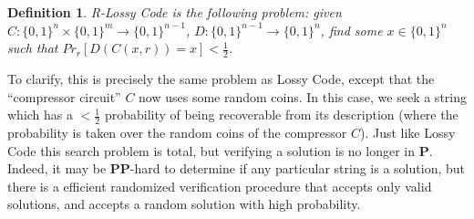 \documentclass[11pt]{article}
\newtheorem{definition}{Definition}
\newcommand{\B}{\{0,1\}}
\def\cl{\bf}
\begin{document}
\begin{definition}
{\sc R-Lossy Code} is the following problem: given $C\colon \B^n \times \B^m \rightarrow \B^{n-1}$, $D\colon \B^{n-1} \rightarrow \B^n$, find some $x \in \B^n$ such that $Pr_r[D(C(x,r)) = x] < \frac{1}{2}$.
\end{definition}
To clarify, this is precisely the same problem as {\sc Lossy Code}, except that the ``compressor circuit'' $C$ now uses some random coins. In this case, we seek a string which has a $<\frac{1}{2}$ probability of being recoverable from its description (where the probability is taken over the random coins of the compressor $C$). Just like {\sc Lossy Code} this search problem is total, but verifying a solution is no longer in {\cl P}. Indeed, it may be {\cl PP}-hard to determine if any particular string is a solution, but there is a efficient randomized verification procedure that accepts only valid solutions, and accepts a random solution with high probability.
\end{document}
